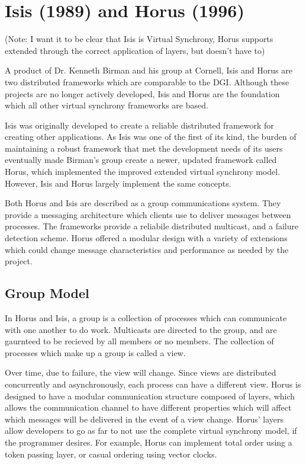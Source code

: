 \section{Isis (1989) and Horus (1996)}

(Note: I want it to be clear that Isis is Virtual Synchrony, Horus supports extended through the correct application of layers, but doesn't have to)

A product of Dr. Kenneth Birman and his group at Cornell, Isis and Horus are
two distributed frameworks which are comparable to the DGI. Although these
projects are no longer actively developed, Isis and Horus are the foundation
which all other virtual synchrony frameworks are based.

Isis was originally developed to create a reliable distributed framework for
creating other applications. As Isis was one of the first of its kind, the
burden of maintaining a robust framework that met the development needs of its
users eventually made Birman's group create a newer, updated framework called
Horus, which implemented the improved extended virtual synchrony model. However, 
Isis and Horus largely implement the same concepts.

Both Horus and Isis are described as a group communications system. They provide a 
messaging architecture which clients use to deliver messages between processes.
The frameworks provide a reliabile distributed multicast, and a failure
detection scheme. Horus offered a modular design with a variety of extensions
which could change message characteristics and performance as needed by the 
project.

\subsection{Group Model}
In Horus and Isis, a group is a collection of processes which can communicate with one
another to do work. Multicasts are directed to the group, and are gaurnteed to
be recieved by all members or no members. The collection of processes which
make up a group is called a view.

Over time, due to failure, the view will change. Since views are distributed
concurrently and asynchronously, each process can have a different view. Horus
is designed to have a modular communication structure composed of layers, which 
allows the communication channel to have different properties which will affect
which messages will be delivered in the event of a view change. Horus' layers
allow developers to go as far to not use the complete virtual synchrony model,
if the programmer desires. For example, Horus can implement total order using
a token passing layer, or casual ordering using vector clocks.

